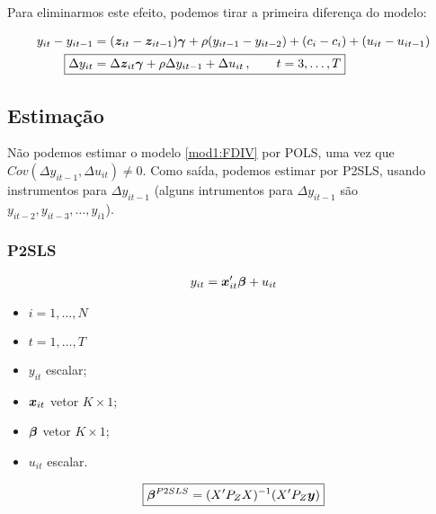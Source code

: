 \documentclass[11pt, oneside, a4paper, article]{article}
\numberwithin{equation}{section}
\begin{document}
\begin{description}
\begin{description}
Para eliminarmos este efeito, podemos tirar a primeira diferença do modelo:

\vspace{-1 em}
\begin{align}
\nonumber
y_{it} - y_{it-1} &= 
(\mbs{z}_{it} - \mbs{z}_{it-1}) \mbs{\gamma} +
\rho (y_{i t - 1} -  y_{i t - 2} ) +
(c_{i} - c_{i}) + (u_{it} - u_{it-1})
\\
\label{mod1:FDIV}
\Aboxed{
\Delta y_{it} &= 
\Delta \mbs{z}_{it} \mbs{\gamma} + \rho \Delta y_{i t - 1} + \Delta u_{it}
\, , \qquad t=3, \dots, T}
\end{align}

\subsection*{Estimação}

Não podemos estimar o modelo \eqref{mod1:FDIV} por POLS, uma vez que $Cov(\Delta y_{it-1}, \Delta u_{it} ) \neq 0$.
Como saída, podemos estimar por P2SLS, usando instrumentos para $\Delta y_{it-1}$ (alguns intrumentos para $\Delta y_{it-1}$ são $y_{it-2}, y_{it-3}, \dots, y_{i1}$).

\subsubsection*{P2SLS}

\vspace{-1 em}
\begin{align*}
	y_{it} = \boldsymbol{x}_{it}' \boldsymbol{\beta} + u_{it}
\end{align*}

\begin{itemize}\itemsep0pt
\item $i = 1, \dots, N$
\item $t = 1, \dots, T$
\item $y_{it}$ escalar;
\item $\boldsymbol{x}_{it}$  vetor $K \times 1$;
\item $\boldsymbol{\beta}$ vetor $K \times 1$;
\item $u_{it}$ escalar.
\end{itemize}

\vspace{-1 em}
\begin{align*}
\boxed{
\boldsymbol{\beta}^{P2SLS} =  ( X' P_{Z} X )^{-1} ( X' P_{Z} \boldsymbol{y} ) }
\end{align*}


\end{description}
\end{description}
\end{document}
